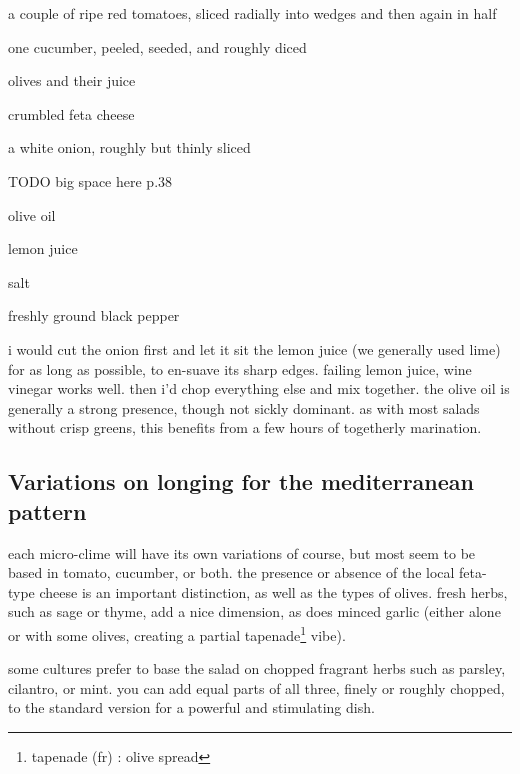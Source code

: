 \begin{ingredients}
  \item a couple of ripe red tomatoes, sliced radially into wedges and
  then again in half

  \item one cucumber, peeled, seeded, and roughly diced

  \item olives and their juice

  \item crumbled feta cheese

  \item \onehalf a white onion, roughly but thinly sliced

  TODO big space here p.38

  \item olive oil

  \item lemon juice

  \item salt

  \item freshly ground black pepper
\end{ingredients}

i would cut the onion first and let it sit the lemon juice (we generally used 
lime) for as long as possible, to en-suave its sharp edges. failing lemon 
juice, wine vinegar works well. then i'd chop everything else and mix together. 
the olive oil is generally a strong presence, though not sickly dominant. as 
with most salads without crisp greens, this benefits from a few hours of 
togetherly marination.

\subsection{Variations on longing for the mediterranean pattern}

each micro-clime will have its own variations of course, but most seem to be 
based in tomato, cucumber, or both. the presence or absence of the local 
feta-type cheese is an important distinction, as well as the types of olives. 
fresh herbs, such as sage or thyme, add a nice dimension, as does minced garlic 
(either alone or with some olives, creating a partial 
tapenade\footnote{tapenade (fr) : olive spread} vibe).

some cultures prefer to base the salad on chopped fragrant herbs such as 
parsley, cilantro, or mint. you can add equal parts of all three, finely or 
roughly chopped, to the standard version for a powerful and stimulating dish.

